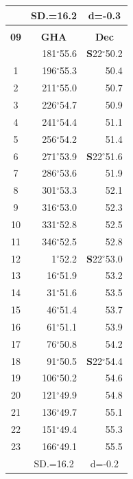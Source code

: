 \documentclass[10pt, a4paper]{report}
\begin{document}
\begin{scriptsize}
\begin{tabular*}{0.2\textwidth}[t]{@{\extracolsep{\fill}}|c|rr|}
\hline
\rule{0pt}{2.4ex} & \multicolumn{1}{c}{SD.=16.2} & \multicolumn{1}{c|}{d=-0.3}\\
\hline
\multicolumn{1}{c}{}\\[-0.5ex]\hline
\multicolumn{1}{|c|}{\rule{0pt}{2.6ex}\textbf{09}} & \multicolumn{1}{c}{\textbf{GHA}} & \multicolumn{1}{c|}{\textbf{Dec}}\\
\hline\rule{0pt}{2.6ex}\noindent
0 & 181$^\circ$55.6 & \textbf{S}22$^\circ$50.2\\
1 & 196$^\circ$55.3 & 50.4\\
2 & 211$^\circ$55.0 & 50.7\\
3 & 226$^\circ$54.7 & \raisebox{0.24ex}{\boldmath$\cdot$~\boldmath$\cdot$~~}50.9\\
4 & 241$^\circ$54.4 & 51.1\\
5 & 256$^\circ$54.2 & 51.4\\[2Pt]
6 & 271$^\circ$53.9 & \textbf{S}22$^\circ$51.6\\
7 & 286$^\circ$53.6 & 51.9\\
8 & 301$^\circ$53.3 & 52.1\\
9 & 316$^\circ$53.0 & \raisebox{0.24ex}{\boldmath$\cdot$~\boldmath$\cdot$~~}52.3\\
10 & 331$^\circ$52.8 & 52.5\\
11 & 346$^\circ$52.5 & 52.8\\[2Pt]
12 & 1$^\circ$52.2 & \textbf{S}22$^\circ$53.0\\
13 & 16$^\circ$51.9 & 53.2\\
14 & 31$^\circ$51.6 & 53.5\\
15 & 46$^\circ$51.4 & \raisebox{0.24ex}{\boldmath$\cdot$~\boldmath$\cdot$~~}53.7\\
16 & 61$^\circ$51.1 & 53.9\\
17 & 76$^\circ$50.8 & 54.2\\[2Pt]
18 & 91$^\circ$50.5 & \textbf{S}22$^\circ$54.4\\
19 & 106$^\circ$50.2 & 54.6\\
20 & 121$^\circ$49.9 & 54.8\\
21 & 136$^\circ$49.7 & \raisebox{0.24ex}{\boldmath$\cdot$~\boldmath$\cdot$~~}55.1\\
22 & 151$^\circ$49.4 & 55.3\\
23 & 166$^\circ$49.1 & 55.5\\
\hline
\rule{0pt}{2.4ex} & \multicolumn{1}{c}{SD.=16.2} & \multicolumn{1}{c|}{d=-0.2}\\
\hline
\end{tabular*}\noindent
\begin{tabular*}{0.2\textwidth}[t]{@{\extracolsep{\fill}}|c|rr|}

\end{tabular*}
\end{scriptsize}
\end{document}

